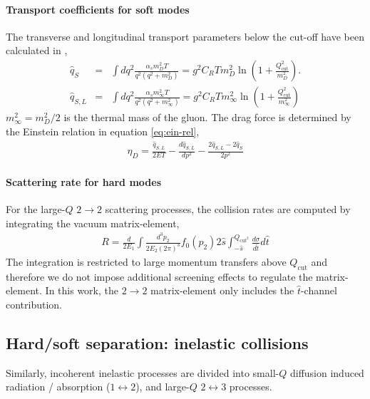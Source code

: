 \paragraph{Transport coefficients for soft modes} The transverse and longitudinal transport parameters below the cut-off have been calculated in \cite{Ghiglieri:2015ala},
\begin{eqnarray}
\hat{q}_S &=& \int dq^2 \frac{\alpha_s m_D^2 T}{q^2 (q^2+m_D^2)} = g^2 C_R T m_D^2  \ln\left(1+\frac{Q_{\textrm{cut}}^2}{m_D^2}\right).
\label{eq:qS} \\
\hat{q}_{S,L} &=& \int dq^2 \frac{\alpha_s m_\infty^2 T}{q^2 (q^2+m_\infty^2)} = g^2 C_R T m_\infty^2  \ln\left(1+\frac{Q_{\textrm{cut}}^2}{m_\infty^2}\right)
\label{eq:qSL} 
\end{eqnarray}
$m_\infty^2 = m_D^2/2$ is the thermal mass of the gluon. 
The drag force is determined by the Einstein relation in equation \ref{eq:ein-rel},
\begin{eqnarray}
\eta_D = \frac{\hat{q}_{S,L}}{2ET} - \frac{d\hat{q}_{S,L}}{dp^2} - \frac{2\hat{q}_{S,L} - 2\hat{q}_S}{2p^2}
\end{eqnarray}

\paragraph{Scattering rate for hard modes} For the large-$Q$ $2\rightarrow 2$ scattering processes, the collision rates are computed by integrating the vacuum matrix-element, 
\begin{eqnarray}
R = \frac{d}{2E_1}\int  \frac{d^3p_2}{2E_2(2\pi)^3} f_0(p_2)2\hat{s} \int_{-\hat{s}}^{Q_{\textrm{cut}^2}}\frac{d\sigma}{d\hat{t}}d\hat{t}
\end{eqnarray}
The integration is restricted to large momentum transfers above $Q_{\textrm{cut}}$ and therefore we do not impose additional screening effects to regulate the matrix-element.
In this work, the $2\rightarrow 2$ matrix-element only includes the $\hat{t}$-channel contribution.

\subsection{Hard/soft separation: inelastic collisions}
Similarly, incoherent inelastic processes are divided into small-$Q$ diffusion induced radiation / absorption ($1\leftrightarrow 2$), and large-$Q$ $2\leftrightarrow 3$ processes.

